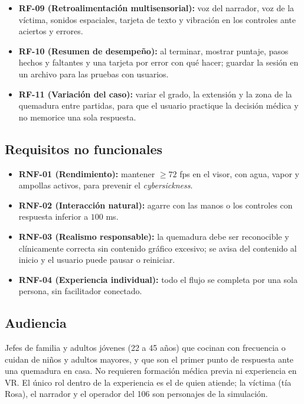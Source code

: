 \documentclass[11pt,a4paper]{article}
\begin{document}
\begin{itemize}
    \item \textbf{RF-09 (Retroalimentación multisensorial):} voz del narrador, voz de la víctima, sonidos espaciales, tarjeta de texto y vibración en los controles ante aciertos y errores.
    \item \textbf{RF-10 (Resumen de desempeño):} al terminar, mostrar puntaje, pasos hechos y faltantes y una tarjeta por error con qué hacer; guardar la sesión en un archivo para las pruebas con usuarios.
    \item \textbf{RF-11 (Variación del caso):} variar el grado, la extensión y la zona de la quemadura entre partidas, para que el usuario practique la decisión médica y no memorice una sola respuesta.
\end{itemize}

\subsection{Requisitos no funcionales}
\begin{itemize}
    \item \textbf{RNF-01 (Rendimiento):} mantener \(\ge 72\) fps en el visor, con agua, vapor y ampollas activos, para prevenir el \textit{cybersickness}.
    \item \textbf{RNF-02 (Interacción natural):} agarre con las manos o los controles con respuesta inferior a \(100\) ms.
    \item \textbf{RNF-03 (Realismo responsable):} la quemadura debe ser reconocible y clínicamente correcta sin contenido gráfico excesivo; se avisa del contenido al inicio y el usuario puede pausar o reiniciar.
    \item \textbf{RNF-04 (Experiencia individual):} todo el flujo se completa por una sola persona, sin facilitador conectado.
\end{itemize}

\subsection{Audiencia}
Jefes de familia y adultos jóvenes (22 a 45 años) que cocinan con frecuencia o cuidan de niños y adultos mayores, y que son el primer punto de respuesta ante una quemadura en casa. No requieren formación médica previa ni experiencia en VR. El único rol dentro de la experiencia es el de quien atiende; la víctima (tía Rosa), el narrador y el operador del 106 son personajes de la simulación.
\end{document}
